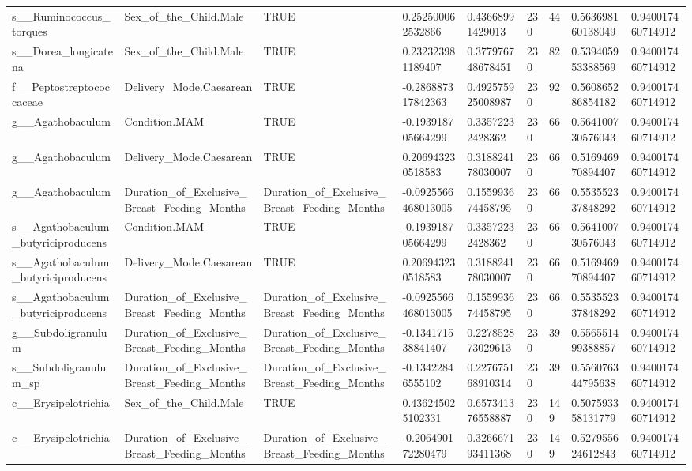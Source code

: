 \begin{longtable}{lllllllll}
s\_\_Ruminococcus\_torques & Sex\_of\_the\_Child.Male & TRUE & 0.252500062532866 & 0.43668991429013 & 230 & 44 & 0.563698160138049 & 0.940017460714912 \\
s\_\_Dorea\_longicatena & Sex\_of\_the\_Child.Male & TRUE & 0.232323981189407 & 0.377976748678451 & 230 & 82 & 0.539405953388569 & 0.940017460714912 \\
f\_\_Peptostreptococcaceae & Delivery\_Mode.Caesarean & TRUE & -0.286887317842363 & 0.492575925008987 & 230 & 92 & 0.560865286854182 & 0.940017460714912 \\
g\_\_Agathobaculum & Condition.MAM & TRUE & -0.193918705664299 & 0.33572232428362 & 230 & 66 & 0.564100730576043 & 0.940017460714912 \\
g\_\_Agathobaculum & Delivery\_Mode.Caesarean & TRUE & 0.206943230518583 & 0.318824178030007 & 230 & 66 & 0.516946970894407 & 0.940017460714912 \\
g\_\_Agathobaculum & Duration\_of\_Exclusive\_Breast\_Feeding\_Months & Duration\_of\_Exclusive\_Breast\_Feeding\_Months & -0.0925566468013005 & 0.155993674458795 & 230 & 66 & 0.553552337848292 & 0.940017460714912 \\
s\_\_Agathobaculum\_butyriciproducens & Condition.MAM & TRUE & -0.193918705664299 & 0.33572232428362 & 230 & 66 & 0.564100730576043 & 0.940017460714912 \\
s\_\_Agathobaculum\_butyriciproducens & Delivery\_Mode.Caesarean & TRUE & 0.206943230518583 & 0.318824178030007 & 230 & 66 & 0.516946970894407 & 0.940017460714912 \\
s\_\_Agathobaculum\_butyriciproducens & Duration\_of\_Exclusive\_Breast\_Feeding\_Months & Duration\_of\_Exclusive\_Breast\_Feeding\_Months & -0.0925566468013005 & 0.155993674458795 & 230 & 66 & 0.553552337848292 & 0.940017460714912 \\
g\_\_Subdoligranulum & Duration\_of\_Exclusive\_Breast\_Feeding\_Months & Duration\_of\_Exclusive\_Breast\_Feeding\_Months & -0.134171538841407 & 0.227852873029613 & 230 & 39 & 0.556551499388857 & 0.940017460714912 \\
s\_\_Subdoligranulum\_sp & Duration\_of\_Exclusive\_Breast\_Feeding\_Months & Duration\_of\_Exclusive\_Breast\_Feeding\_Months & -0.13422846555102 & 0.227675168910314 & 230 & 39 & 0.556076344795638 & 0.940017460714912 \\
c\_\_Erysipelotrichia & Sex\_of\_the\_Child.Male & TRUE & 0.436245025102331 & 0.657341376558887 & 230 & 149 & 0.507593358131779 & 0.940017460714912 \\
c\_\_Erysipelotrichia & Duration\_of\_Exclusive\_Breast\_Feeding\_Months & Duration\_of\_Exclusive\_Breast\_Feeding\_Months & -0.206490172280479 & 0.326667193411368 & 230 & 149 & 0.527955624612843 & 0.940017460714912 \\

\end{longtable}
